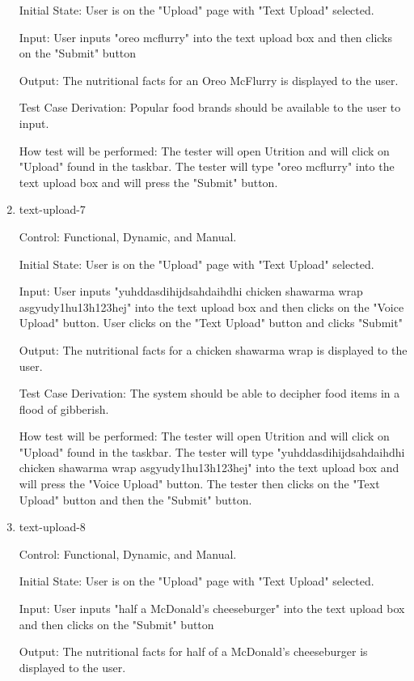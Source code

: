 \documentclass[12pt, titlepage]{article}
\begin{document}
\begin{enumerate}
	Initial State: User is on the "Upload" page with "Text Upload" selected.
	
	Input: User inputs "oreo mcflurry" into the text upload box and then clicks on the "Submit" button
	
	Output: The nutritional facts for an Oreo McFlurry is displayed to the user.
	
	Test Case Derivation: Popular food brands should be available to the user to input.
	
	How test will be performed: The tester will open Utrition and will click on "Upload" found in the taskbar. The tester will type "oreo mcflurry" into the text upload box and will press the "Submit" button.
	
	\item{text-upload-7\\}
	
	Control: Functional, Dynamic, and Manual.
	
	Initial State: User is on the "Upload" page with "Text Upload" selected.
	
	Input: User inputs "yuhddasdihijdsahdaihdhi chicken shawarma wrap asgyudy1hu13h123hej" into the text upload box and then clicks on the "Voice Upload" button. User clicks on the "Text Upload" button and clicks "Submit"
	
	Output: The nutritional facts for a chicken shawarma wrap is displayed to the user.
	
	Test Case Derivation: The system should be able to decipher food items in a flood of gibberish.
	
	How test will be performed: The tester will open Utrition and will click on "Upload" found in the taskbar. The tester will type "yuhddasdihijdsahdaihdhi chicken shawarma wrap asgyudy1hu13h123hej" into the text upload box and will press the "Voice Upload" button. The tester then clicks on the "Text Upload" button and then the "Submit" button.
	
	\item{text-upload-8\\}
	
	Control: Functional, Dynamic, and Manual.
	
	Initial State: User is on the "Upload" page with "Text Upload" selected.
	
	Input: User inputs "half a McDonald's cheeseburger" into the text upload box and then clicks on the "Submit" button
	
	Output: The nutritional facts for half of a McDonald's cheeseburger is displayed to the user.
	

\end{enumerate}
\end{document}
